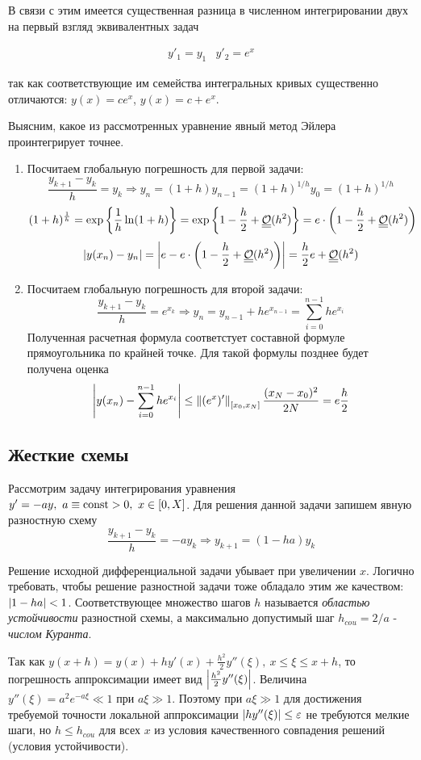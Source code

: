 В связи с этим имеется существенная разница в численном интегрировании
двух на первый взгляд эквивалентных задач

\[\begin{array}{cc} y'_1=y_1 & y'_2=e^x \end{array}\]

так как соответствующие им семейства интегральных кривых существенно
отличаются: $y(x) = ce^x$, $y(x) = c+e^x$.

Выясним, какое из рассмотренных уравнение явный метод
Эйлера проинтегрирует точнее.

\begin{enumerate}
  \item Посчитаем глобальную погрешность для первой задачи:
        \[\frac{y_{k+1}-y_k}{h}=y_k\Rightarrow y_{n}=(1+h)y_{n-1}=(1+h)^{1/h}y_0=(1+h)^{1/h}\]
        \[(1+h)^{\frac{1}{h}}=\exp\left\{\frac{1}{h}\ln(1+h)\right\}=\exp\left\{1-\frac{h}{2}+\underline{\underline{\mathcal{O}}}(h^2)\right\}=e\cdot\left(1-\frac{h}{2}+\underline{\underline{\mathcal{O}}}(h^2)\right)\]
        \[\left\lvert y(x_n)-y_n\right\rvert=\left\lvert e-e\cdot\left(1-\frac{h}{2}+\underline{\underline{\mathcal{O}}}(h^2)\right)\right\rvert=\frac{h}{2}e+\underline{\underline{\mathcal{O}}}(h^2)\]
  \item Посчитаем глобальную погрешность для второй задачи:
        \[\frac{y_{k+1}-y_k}{h}=e^{x_k}\Rightarrow y_{n}=y_{n-1}+he^{x_{n-1}}=\sum_{i=0}^{n-1}he^{x_i}\]
        Полученная расчетная формула соответстует составной формуле прямоугольника
        по крайней точке. Для такой формулы позднее будет получена
        оценка
        \[\left\lvert y(x_n)-\sum_{i=0}^{n-1}he^{x_i}\right\rvert\leq \left\lVert(e^x)'\right\rVert_{[x_0,x_N]}\frac{(x_N-x_0)^2}{2N}=e\frac{h}{2}\]
\end{enumerate}

\subsection*{Жесткие схемы}

Рассмотрим задачу интегрирования уравнения $y'=-ay,\ a\equiv\mathrm{const}>0,\ x\in[0,X]$.
Для решения данной задачи запишем явную разностную схему
\[\frac{y_{k+1}-y_k}{h}=-ay_{k}\Rightarrow y_{k+1}=(1-ha)y_k\]

Решение исходной дифференциальной задачи убывает при увеличении $x$.
Логично требовать, чтобы решение разностной задачи
тоже обладало этим же качеством: $\left\lvert1-ha\right\rvert<1$.
Соответствующее множество шагов $h$ называется \textit{областью устойчивости}
разностной схемы, а максимально допустимый шаг $h_{cou}=2/a$ - \textit{числом Куранта}.

Так как $y(x+h)=y(x)+hy'(x)+\frac{h^2}{2}y''(\xi),\ x\leq\xi\leq x+h$,
то погрешность аппроксимации имеет вид $\left\lvert\frac{h^2}{2}y''(\xi)\right\rvert$.
Величина $y''(\xi) = a^2e^{-a\xi} \ll 1$ при $a\xi\gg1$. Поэтому при
$a\xi\gg1$ для достижения требуемой точности локальной аппроксимации
$\left\lvert hy''(\xi)\right\rvert\leq\varepsilon$ не требуются мелкие шаги, но $h \leq h_{cou}$
для всех $x$ из условия качественного совпадения решений (условия устойчивости).

